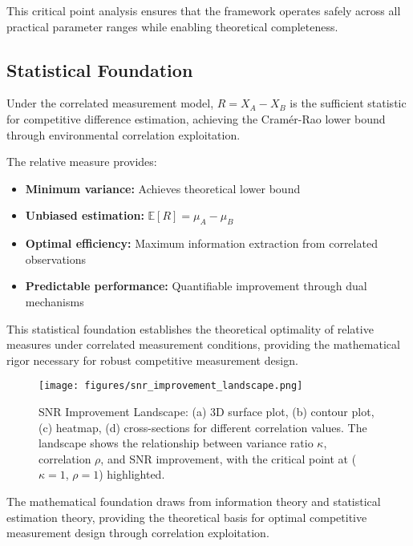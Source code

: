 This critical point analysis ensures that the framework operates safely across all practical parameter ranges while enabling theoretical completeness.

\subsection{Statistical Foundation}

Under the correlated measurement model, $R = X_A - X_B$ is the sufficient statistic for competitive difference estimation, achieving the Cramér-Rao lower bound through environmental correlation exploitation.

The relative measure provides:
\begin{itemize}
    \item \textbf{Minimum variance:} Achieves theoretical lower bound
    \item \textbf{Unbiased estimation:} $\mathbb{E}[R] = \mu_A - \mu_B$
    \item \textbf{Optimal efficiency:} Maximum information extraction from correlated observations
    \item \textbf{Predictable performance:} Quantifiable improvement through dual mechanisms
\end{itemize}

This statistical foundation establishes the theoretical optimality of relative measures under correlated measurement conditions, providing the mathematical rigor necessary for robust competitive measurement design.

\begin{figure}[h]
\centering
\texttt{[image: figures/snr\_improvement\_landscape.png]}
\caption{SNR Improvement Landscape: (a) 3D surface plot, (b) contour plot, (c) heatmap, (d) cross-sections for different correlation values. The landscape shows the relationship between variance ratio $\kappa$, correlation $\rho$, and SNR improvement, with the critical point at ($\kappa=1$, $\rho=1$) highlighted.}
\label{fig:snr_landscape}
\end{figure}

The mathematical foundation draws from information theory \cite{shannon1948mathematical} and statistical estimation theory, providing the theoretical basis for optimal competitive measurement design through correlation exploitation.
